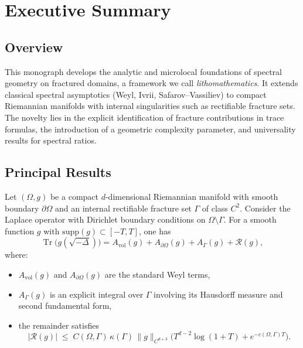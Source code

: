 
\chapter*{Executive Summary}
\label{chap:executive-summary}

\section*{Overview}

This monograph develops the analytic and microlocal foundations of spectral geometry 
on fractured domains, a framework we call \emph{lithomathematics}. 
It extends classical spectral asymptotics (Weyl, Ivrii, Safarov–Vassiliev) 
to compact Riemannian manifolds with internal singularities such as rectifiable 
fracture sets. The novelty lies in the explicit identification of fracture 
contributions in trace formulas, the introduction of a geometric complexity 
parameter, and universality results for spectral ratios.

\section*{Principal Results}

\begin{theorem}
\label{thm:trace}
Let $(\Omega,g)$ be a compact $d$-dimensional Riemannian manifold with smooth boundary 
$\partial\Omega$ and an internal rectifiable fracture set $\Gamma$ of class $C^2$. 
Consider the Laplace operator with Dirichlet boundary conditions on $\Omega\setminus\Gamma$. 
For a smooth function $g$ with $\mathrm{supp}(g)\subset[-T,T]$, one has
\[
\operatorname{Tr}\!\big(g(\sqrt{-\Delta})\big)
  = A_{\mathrm{vol}}(g) + A_{\partial\Omega}(g) 
  + A_{\Gamma}(g) + \mathcal{R}(g),
\]
where:
\begin{itemize}
    \item $A_{\mathrm{vol}}(g)$ and $A_{\partial\Omega}(g)$ are the standard Weyl terms,
    \item $A_{\Gamma}(g)$ is an explicit integral over $\Gamma$ involving its 
    Hausdorff measure and second fundamental form,
    \item the remainder satisfies
    \[
    |\mathcal{R}(g)| \;\leq\; 
        C(\Omega,\Gamma)\,\kappa(\Gamma)\,
        \|g\|_{C^{d+3}}\big(T^{d-2}\log(1+T)+e^{-c(\Omega,\Gamma)T}\big).
    \]
\end{itemize}
\end{theorem}


